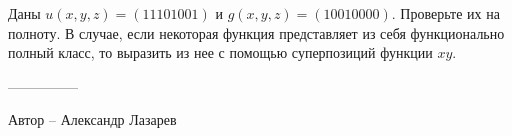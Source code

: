 \question
Даны $u(x, y, z) = (11101001)$ и $g(x, y, z) = (10010000)$. Проверьте их на полноту. В случае, если некоторая функция представляет из себя функционально полный класс, то выразить из нее с помощью суперпозиций функции $xy$.

---------------

Автор -- Александр Лазарев